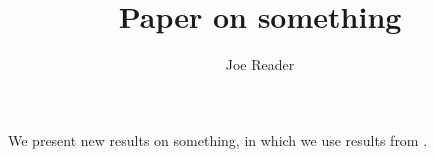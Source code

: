 \documentclass[12pt]{article}
\title{Paper on something}
\author{Joe Reader}
\begin{document}
\maketitle

We present new results on something, 
in which we use results from \citet{test}.




\end{document}
